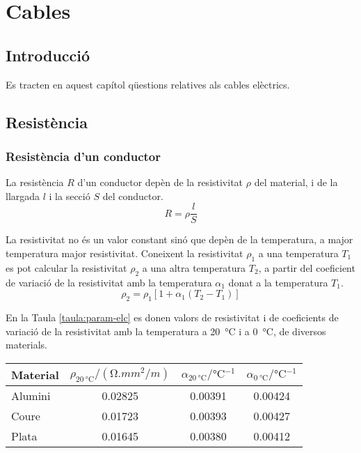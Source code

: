 \chapter{Cables}

\section{Introducció}
Es tracten en aquest capítol qüestions relatives als cables elèctrics.

\section{Resistència}

\subsection{Resistència d'un conductor}

La resistència $R$ d'un conductor depèn de la resistivitat $\rho$
del material, i de la llargada $l$ i  la secció
$S$  del conductor.
\begin{equation}
   R= \rho \frac{l}{S}
\end{equation}
\index{$\rho$}

La resistivitat no
és un valor constant sinó que depèn de la temperatura, a major
temperatura major resistivitat. Coneixent la resistivitat $\rho_1$ a una
temperatura $T_1$ es pot calcular la resistivitat $\rho_2$ a una altra
temperatura $T_2$, a partir del coeficient de variació de la
resistivitat amb la temperatura $\alpha_1$ donat a la temperatura $T_1$.
\begin{equation}
   \rho_2 = \rho_1 [1 + \alpha_1 (T_2 - T_1)]\label{eq:resistivitat}
\end{equation}
\index{$\alpha$}

En la Taula
\vref{taula:param-elc} es donen valors de resistivitat i de
coeficients de variació de la resistivitat amb la temperatura a
\SI{20}{\degreeCelsius} i a \SI{0}{\degreeCelsius}, de diversos materials.

\begin{center}
   \label{taula:param-elc}
   \begin{tabular}{lccc}
   \toprule[1pt]
   Material & $\rho_{\SI{20}{\degreeCelsius}} / (\si{\ohm.mm^2/m})$ & $\alpha_{\SI{20}{\degreeCelsius}} / \si{\degreeCelsius^{-1}}$ &
   $\alpha_{\SI{0}{\degreeCelsius}} / \si{\degreeCelsius^{-1}}$
   \\
   \midrule
      Alumini & \num{0,02825} & \num{0,00391} & \num{0,00424} \\
      Coure   & \num{0,01723} & \num{0,00393} & \num{0,00427} \\
      Plata   & \num{0,01645} & \num{0,00380} & \num{0,00412} \\
   \bottomrule[1pt]
   \end{tabular}
\end{center}

